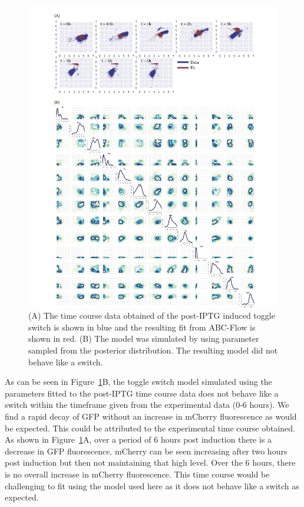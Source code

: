 \begin{figure}[htbp]
\centerfloat%
	\includegraphics[width=1.2\textwidth]{../../chapters/chapterABCFlow/images/2D_real_res_IPTG.png}
	\caption[ABC-Flow fit to post-\acrshort{atc} time course data]{\label{fig:1d-real-res-iptg} (A) The time course data obtained of the post-IPTG induced toggle switch is shown in blue and the resulting fit from ABC-Flow is shown in red. (B) The model was simulated by using parameter sampled from the posterior distribution. The resulting model did not behave like a switch. }
\end{figure}

As can be seen in Figure~\ref{fig:1d-real-res-iptg}B, the toggle switch model simulated using the parameters fitted to the post-IPTG time course data does not behave like a switch within the timeframe given from the experimental data (0-6 hours). We find a rapid decay of GFP without an increase in mCherry fluorescence as would be expected. This could be attributed to the experimental time course obtained. As shown in Figure~\ref{fig:1d-real-res-iptg}A, over a period of 6 hours post induction there is a decrease in GFP fluorescence. mCherry can be seen increasing after two hours post induction but then not maintaining that high level. Over the 6 hours, there is no overall increase in mCherry fluorescence. This time course would be challenging to fit using the model used here as it does not behave like a switch as expected. 

